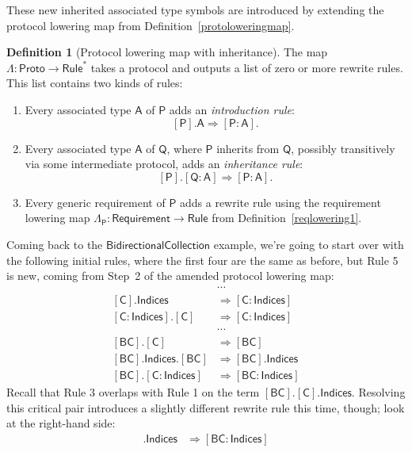 \documentclass[headsepline,bibliography=totoc]{scrreport}
\newcommand{\namesym}[1]{\mathsf{#1}}
\newcommand{\proto}[1]{\bm{\mathsf{#1}}}
\newcommand{\protosym}[1]{[\proto{#1}]}
\newcommand{\assocsym}[2]{[\proto{#1}\colon\namesym{#2}]}
\theoremstyle{definition}
\theoremstyle{definition}
\newtheorem{definition}{Definition}[chapter]
\theoremstyle{definition}
\begin{document}
These new inherited associated type symbols are introduced by extending the protocol lowering map from Definition~\ref{protoloweringmap}.
\begin{definition}[Protocol lowering map with inheritance]\label{protoloweringmap2}
The map $\Lambda\colon\namesym{Proto}\rightarrow\namesym{Rule}^*$ takes a protocol and outputs a list of zero or more rewrite rules. This list contains two kinds of rules:
\begin{enumerate}
\item Every associated type $\namesym{A}$ of $\proto{P}$ adds an \emph{introduction rule}:
\[\protosym{P}.\namesym{A}\Rightarrow\assocsym{P}{A}.\]
\item Every associated type $\namesym{A}$ of $\proto{Q}$, where $\proto{P}$ inherits from $\proto{Q}$, possibly transitively via some intermediate protocol, adds an \emph{inheritance rule}:
\[\protosym{P}.\assocsym{Q}{A}\Rightarrow\assocsym{P}{A}.\]
\item Every generic requirement of $\proto{P}$ adds a rewrite rule using the requirement lowering map $\Lambda_{\proto{P}}:\namesym{Requirement}\rightarrow\namesym{Rule}$ from Definition~\ref{reqlowering1}.
\end{enumerate}
\end{definition}
Coming back to the $\proto{BidirectionalCollection}$ example, we're going to start over with the following initial rules, where the first four are the same as before, but Rule 5 is new, coming from Step~2 of the amended protocol lowering map:
\begin{align}
&\cdots\nonumber\\
\protosym{C}.\namesym{Indices}&\Rightarrow\assocsym{C}{Indices}\tag{1}\\
\assocsym{C}{Indices}.\protosym{C}&\Rightarrow\assocsym{C}{Indices}\tag{2}\\
&\cdots\nonumber\\
\protosym{BC}.\protosym{C}&\Rightarrow\protosym{BC}\tag{3}\\
\protosym{BC}.\namesym{Indices}.\protosym{BC}&\Rightarrow\protosym{BC}.\namesym{Indices}\tag{4}\\
\protosym{BC}.\assocsym{C}{Indices}&\Rightarrow\assocsym{BC}{Indices}\tag{5}
\end{align}
Recall that Rule 3 overlaps with Rule 1 on the term $\protosym{BC}.\protosym{C}.\namesym{Indices}$. Resolving this critical pair introduces a slightly different rewrite rule this time, though; look at the right-hand side:
\begin{align}
\protosym{BC}.\namesym{Indices}&\Rightarrow\assocsym{BC}{Indices}\tag{6}
\end{align}
\end{document}
